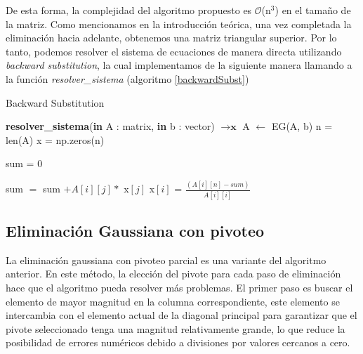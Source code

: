 De esta forma, la complejidad del algoritmo propuesto es $\mathcal{O}$(n$^3$) en el tamaño de la matriz.
Como mencionamos en la introducción teórica, una vez completada la eliminación hacia adelante, obtenemos una matriz triangular superior. Por lo tanto, podemos resolver el sistema de ecuaciones de manera directa utilizando \textit{backward substitution}, la cual implementamos de la siguiente manera llamando a la función \textit{resolver\_sistema} (algoritmo \ref{backwardSubst})

\begin{algorithm}
\caption{Backward Substitution}\label{backwardSubst}
\begin{algorithmic}
\State \textbf{resolver\_sistema}(\textbf{in} A : matrix, \textbf{in} b : vector) $\to \textbf{x}$
 \State A $\gets$ EG(A, b) 
\State n = len(A)
\State x = np.zeros(n)

    \State sum = 0
        
            \State sum $=$ sum $+ A[i][j] *$ x$[j]$
        \EndIf       
        \State x$[i]$ = $\frac{(A[i][n] - sum)}{A[i][i]}$
    \EndFor
\EndFor
{}
\end{algorithmic}
\end{algorithm}

\subsection{Eliminación Gaussiana con pivoteo} \label{seccion_EG_pivot}
La eliminación gaussiana con pivoteo parcial es una variante del algoritmo anterior.
En este método, la elección del pivote para cada paso de eliminación hace que el algoritmo pueda resolver más problemas. El primer paso es buscar el elemento de mayor magnitud en la columna correspondiente, este elemento se intercambia con el elemento actual de la diagonal principal para garantizar que el pivote seleccionado tenga una magnitud relativamente grande, lo que reduce la posibilidad de errores numéricos debido a divisiones por valores cercanos a cero.

